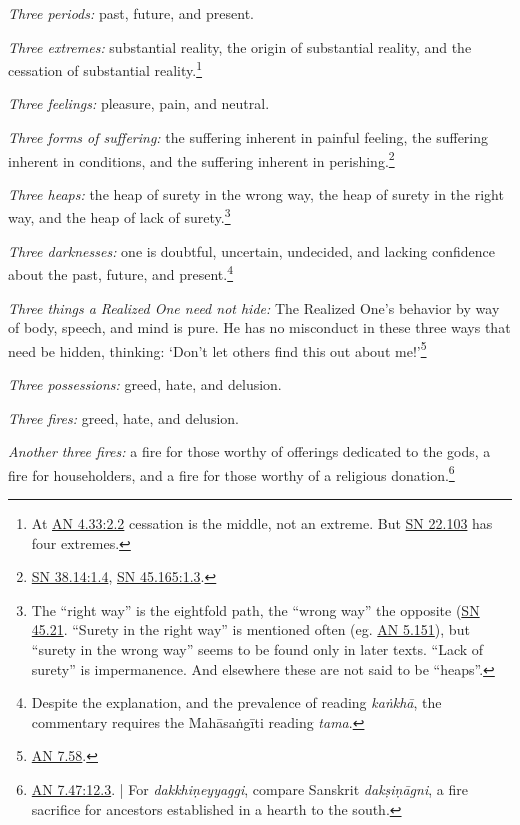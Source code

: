 \documentclass[12pt,openany]{book}%
\begin{document}
\emph{Three periods:} past, future, and present. 

\emph{Three extremes:} substantial reality, the origin of substantial reality, and the cessation of substantial reality.\footnote{At \href{https://suttacentral.net/an4.33/en/sujato\#2.2}{AN 4.33:2.2} cessation is the middle, not an extreme. But \href{https://suttacentral.net/sn22.103/en/sujato}{SN 22.103} has four extremes. } 

\emph{Three feelings:} pleasure, pain, and neutral. 

\emph{Three forms of suffering:} the suffering inherent in painful feeling, the suffering inherent in conditions, and the suffering inherent in perishing.\footnote{\href{https://suttacentral.net/sn38.14/en/sujato\#1.4}{SN 38.14:1.4}, \href{https://suttacentral.net/sn45.165/en/sujato\#1.3}{SN 45.165:1.3}. } 

\emph{Three heaps:} the heap of surety in the wrong way, the heap of surety in the right way, and the heap of lack of surety.\footnote{The “right way” is the eightfold path, the “wrong way” the opposite (\href{https://suttacentral.net/sn45.21/en/sujato}{SN 45.21}. “Surety in the right way” is mentioned often (eg. \href{https://suttacentral.net/an5.151/en/sujato}{AN 5.151}), but “surety in the wrong way” seems to be found only in later texts. “Lack of surety” is impermanence. And elsewhere these are not said to be “heaps”. } 

\emph{Three darknesses:} one is doubtful, uncertain, undecided, and lacking confidence about the past, future, and present.\footnote{Despite the explanation, and the prevalence of reading \textit{\textsanskrit{kaṅkhā}}, the commentary requires the \textsanskrit{Mahāsaṅgīti} reading \textit{tama}. } 

\emph{Three things a Realized One need not hide:} The Realized One’s behavior by way of body, speech, and mind is pure. He has no misconduct in these three ways that need be hidden, thinking: ‘Don’t let others find this out about me!’\footnote{\href{https://suttacentral.net/an7.58/en/sujato}{AN 7.58}. } 

\emph{Three possessions:} greed, hate, and delusion. 

\emph{Three fires:} greed, hate, and delusion. 

\emph{Another three fires:} a fire for those worthy of offerings dedicated to the gods, a fire for householders, and a fire for those worthy of a religious donation.\footnote{\href{https://suttacentral.net/an7.47/en/sujato\#12.3}{AN 7.47:12.3}. | For \textit{\textsanskrit{dakkhiṇeyyaggi}}, compare Sanskrit \textit{\textsanskrit{dakṣiṇāgni}}, a fire sacrifice for ancestors established in a hearth to the south. } 
\end{document}
